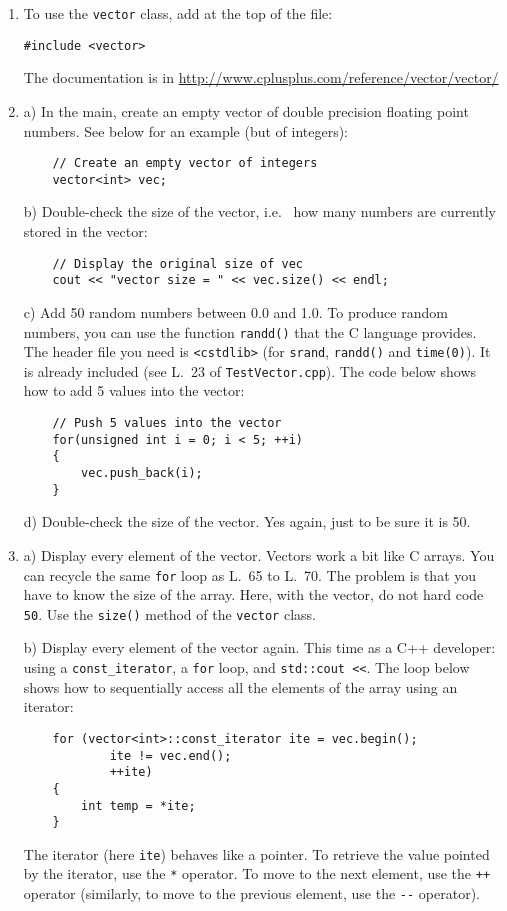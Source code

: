 \begin{enumerate}

\item To use the \verb+vector+ class, add at the top of the file:
\begin{lstlisting}
#include <vector>
\end{lstlisting}
The documentation is in \url{http://www.cplusplus.com/reference/vector/vector/}

\item a) In the main, create an empty vector of double precision floating point numbers. See below for an example (but of integers):
\begin{lstlisting}
    // Create an empty vector of integers
    vector<int> vec;
\end{lstlisting}

 b) Double-check the size of the vector, i.e.~ how many numbers are currently stored in the vector:
\begin{lstlisting}
    // Display the original size of vec
    cout << "vector size = " << vec.size() << endl;
\end{lstlisting}

c) Add 50 random numbers between 0.0 and 1.0. 
To produce random numbers, you can use the function \verb+randd()+ that the C language provides. The header file you need is \verb+<cstdlib>+ (for \verb+srand+, \verb+randd()+ and \verb+time(0)+). 
It is already included (see L.~23 of \verb+TestVector.cpp+).
The code below shows how to add 5 values into the vector:
\begin{lstlisting}
    // Push 5 values into the vector
    for(unsigned int i = 0; i < 5; ++i)
    {
        vec.push_back(i);
    }
\end{lstlisting}

d) Double-check the size of the vector. Yes again, just to be sure it is 50.

\item a) Display every element of the vector. 
Vectors work a bit like C arrays. 
You can recycle the same \verb+for+ loop as L.~65 to L.~70. 
The problem is that you have to know the size of the array. 
Here, with the vector, do not hard code \verb+50+. 
Use the \verb+size()+ method of the \verb+vector+ class. 

b) Display every element of the vector again. 
This time as a C++ developer: 
using a \verb+const_iterator+, a \verb+for+ loop, and \verb+std::cout <<+. 
The loop below shows how to sequentially access all the elements of the array using an iterator:
\begin{lstlisting}
    for (vector<int>::const_iterator ite = vec.begin();
            ite != vec.end();
            ++ite)
    {
        int temp = *ite;
    }
\end{lstlisting}
The iterator (here \verb+ite+) behaves like a pointer. 
To retrieve the value pointed by the iterator, use the \verb+*+ operator. 
To move to the next element, use the \verb!++! operator
(similarly, to move to the previous element, use the \verb!--! operator). 



\end{enumerate}
